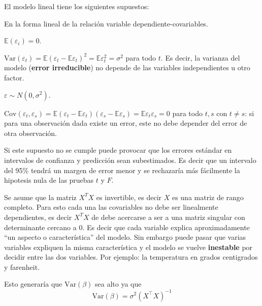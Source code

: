 \documentclass[
  12pt,
]{book}
\providecommand{\tightlist}{%
  \setlength{\itemsep}{0pt}\setlength{\parskip}{0pt}}
\begin{document}
El modelo lineal tiene los siguientes supuestos:

\begin{description}
\tightlist
\item[Linealidad]
En la forma lineal de la relación variable dependiente-covariables.
\item[Errores centrados]
\(\mathbb{E}(\varepsilon_i) = 0\).
\item[Homocedasticidad]
\(\text{Var}(\varepsilon_t) = \mathbb{E}(\varepsilon_t - \mathbb{E} \varepsilon_t)^2 = \mathbb{E} \varepsilon_t^2 = \sigma^2\)
para todo \(t\). Es decir, la varianza del modelo (\textbf{error
irreducible}) no depende de las variables independientes u otro factor.
\item[Normalidad de los residuos]
\(\varepsilon \sim N(0, \sigma^2 )\).
\item[Independencia de los errores]
\(\text{Cov}(\varepsilon_t,\varepsilon_s ) = \mathbb{E} (\varepsilon_t - \mathbb{E} \varepsilon_t) (\varepsilon_s - \mathbb{E} \varepsilon_s) = \mathbb{E} \varepsilon_t \varepsilon_s = 0\)
para todo \(t,s\) con \(t\neq s\): si para una observación dada existe
un error, este no debe depender del error de otra observación.
\end{description}

Si este supuesto no se cumple puede provocar que los errores estándar en
intervalos de confianza y predicción sean subestimados. Es decir que un
intervalo del 95\% tendrá un margen de error menor y se rechazaría más
fácilmente la hipotesis nula de las pruebas \(t\) y \(F\).

\begin{description}
\tightlist
\item[Multicolinealidad]
Se asume que la matriz \(X^TX\) es invertible, es decir \(X\) es una
matriz de rango completo. Para esto cada una las covariables no debe ser
linealmente dependientes, es decir \(X^TX\) de debe acercarse a ser a
una matriz singular con determinante cercano a 0. Es decir que cada
variable explica aproximadamente ``un aspecto o característica'' del
modelo. Sin embargo puede pasar que varias variables expliquen la misma
característica y el modelo se vuelve \textbf{inestable} por decidir
entre las dos variables. Por ejemplo: la temperatura en grados
centigrados y farenheit.
\end{description}

Esto generaría que \(\mathrm{Var}\left(\beta\right)\) sea alto ya que
\begin{equation*}
\text{Var}(\beta) =  \sigma^2(X^{\top}X)^{-1}
\end{equation*}
\end{document}
